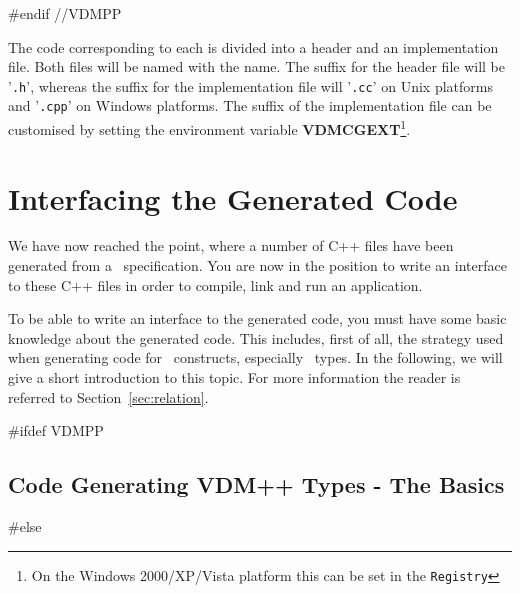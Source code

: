 \documentclass[\pformat,12pt]{article}
\begin{document}
%

#endif //VDMPP

The code corresponding to each \VDM{} 
is divided into a header
and an implementation file. Both files will be named with the 
name. The suffix for the header file will be '\texttt{.h}', whereas the suffix
for the implementation file will '\texttt{.cc}' on Unix platforms and
'\texttt{.cpp}' on 
Windows platforms. The suffix of the implementation file can be
customised by setting the environment variable {\bf
VDMCGEXT}\footnote{On the Windows 2000/XP/Vista platform this can be
set in the \texttt{Registry}}.  

\section{Interfacing the Generated Code}\label{interfacing}

We have now reached the point, where a number of C++ files have been
generated from a \VDM\ specification. 
You are now in the position to write an interface to these C++ files in order to compile, link
and run an application.


To be able to write an interface to the generated code, you
must have some basic knowledge about the generated code. This
includes, first of all, the strategy used when generating code for
\VDM\ constructs, especially \VDM\ types.  In the following, we will 
give a short introduction to this topic. For more information the
reader is referred to Section~\ref{sec:relation}.

#ifdef VDMPP
\subsection{Code Generating VDM++ Types - The Basics}\label{basics}
#else
\end{document}
